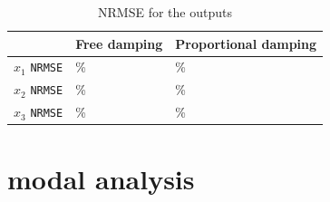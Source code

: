 \documentclass[twosided,a4paper]{article}           %
\begin{document}

\begin{table}[]
	\centering
	\caption{NRMSE for the outputs}
	\label{tab:fit_all}
	\begin{tabular}{l|l|l|}
		\cline{2-3}
		& Free damping  & Proportional damping \\ \hline
		\multicolumn{1}{|l|}{$x_1$ \texttt{NRMSE} } &  \%        &          \%             \\ \hline
		\multicolumn{1}{|l|}{$x_2$ \texttt{NRMSE} } &   \%             &        \%           \\ \hline
		\multicolumn{1}{|l|}{$x_3$ \texttt{NRMSE} } &    \%  &
		 \%                              \\ \hline
	\end{tabular}
\end{table}
\section{modal analysis}
\end{document}
